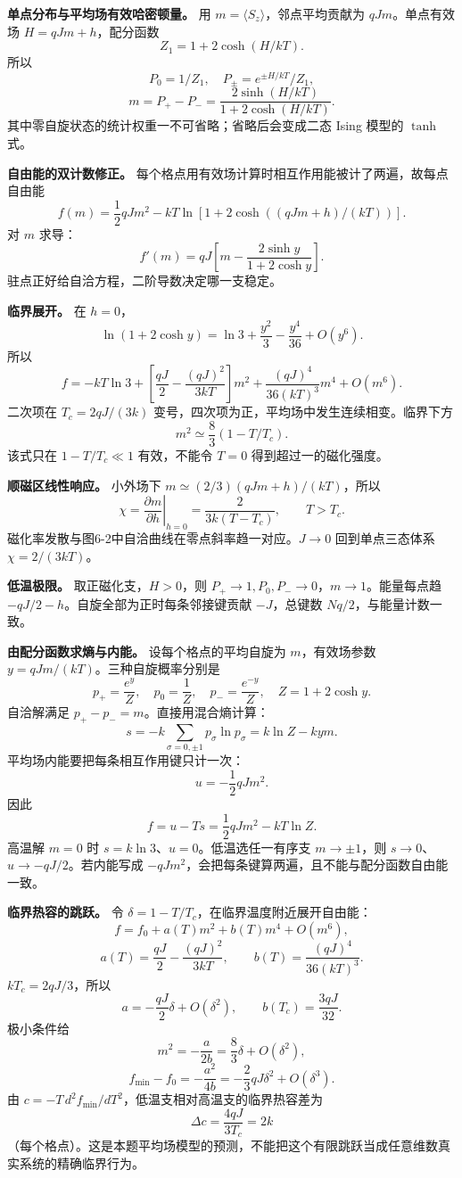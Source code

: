 \documentclass[12pt,a4paper,UTF8]{ctexart}
\begin{document}
\textbf{单点分布与平均场有效哈密顿量。} 用
\(m=\langle S_z\rangle\)，邻点平均贡献为 \(qJm\)。单点有效场
\(H=qJm+h\)，配分函数 \[
Z_1=1+2\cosh(H/kT).
\] 所以 \[
P_0=1/Z_1,\quad P_\pm=e^{\pm H/kT}/Z_1,
\] \[
m=P_+-P_-=\frac{2\sinh(H/kT)}{1+2\cosh(H/kT)}.
\] 其中零自旋状态的统计权重一不可省略；省略后会变成二态 Ising 模型的
\(\tanh\) 式。

\textbf{自由能的双计数修正。}
每个格点用有效场计算时相互作用能被计了两遍，故每点自由能 \[
f(m)=\frac12qJm^2-kT\ln[1+2\cosh((qJm+h)/(kT))].
\] 对 \(m\) 求导： \[
f'(m)=qJ\left[m-\frac{2\sinh y}{1+2\cosh y}\right].
\] 驻点正好给自洽方程，二阶导数决定哪一支稳定。

\textbf{临界展开。} 在 \(h=0\)， \[
\ln(1+2\cosh y)=\ln3+\frac{y^2}3-\frac{y^4}{36}+O(y^6).
\] 所以 \[
f=-kT\ln3+
\left[\frac{qJ}2-\frac{(qJ)^2}{3kT}\right]m^2
+\frac{(qJ)^4}{36(kT)^3}m^4+O(m^6).
\] 二次项在 \(T_c=2qJ/(3k)\)
变号，四次项为正，平均场中发生连续相变。临界下方 \[
\boxed{m^2\simeq\frac83(1-T/T_c)}.
\] 该式只在 \(1-T/T_c\ll1\) 有效，不能令 \(T=0\) 得到超过一的磁化强度。

\textbf{顺磁区线性响应。} 小外场下 \(m\simeq(2/3)(qJm+h)/(kT)\)，所以 \[
\boxed{\chi=\left.\frac{\partial m}{\partial h}\right|_{h=0}
=\frac{2}{3k(T-T_c)}},\qquad T>T_c.
\] 磁化率发散与图6-2中自洽曲线在零点斜率趋一对应。\(J\to0\)
回到单点三态体系 \(\chi=2/(3kT)\)。

\textbf{低温极限。} 取正磁化支，\(H>0\)，则
\(P_+\to1,P_0,P_-\to0\)，\(m\to1\)。能量每点趋
\(-qJ/2-h\)。自旋全部为正时每条邻接键贡献 \(-J\)，总键数
\(Nq/2\)，与能量计数一致。

\textbf{由配分函数求熵与内能。} 设每个格点的平均自旋为 \(m\)，有效场参数
\(y=qJm/(kT)\)。三种自旋概率分别是 \[
p_+=\frac{e^y}{Z},\quad p_0=\frac1Z,\quad
p_-=\frac{e^{-y}}Z,\quad Z=1+2\cosh y.
\] 自洽解满足 \(p_+-p_-=m\)。直接用混合熵计算： \[
s=-k\sum_{\sigma=0,\pm1}p_\sigma\ln p_\sigma
=k\ln Z-kym.
\] 平均场内能要把每条相互作用键只计一次： \[
u=-\frac12qJm^2.
\] 因此 \[
f=u-Ts=\frac12qJm^2-kT\ln Z.
\] 高温解 \(m=0\) 时 \(s=k\ln3\)、\(u=0\)。低温选任一有序支
\(m\to\pm1\)，则 \(s\to0\)、\(u\to-qJ/2\)。若内能写成
\(-qJm^2\)，会把每条键算两遍，且不能与配分函数自由能一致。

\textbf{临界热容的跳跃。} 令
\(\delta=1-T/T_c\)，在临界温度附近展开自由能： \[
f=f_0+a(T)m^2+b(T)m^4+O(m^6),
\] \[
a(T)=\frac{qJ}{2}-\frac{(qJ)^2}{3kT},
\qquad b(T)=\frac{(qJ)^4}{36(kT)^3}.
\] \(kT_c=2qJ/3\)，所以 \[
a=-\frac{qJ}{2}\delta+O(\delta^2),
\qquad b(T_c)=\frac{3qJ}{32}.
\] 极小条件给 \[
m^2=-\frac a{2b}=\frac83\delta+O(\delta^2),
\] \[
f_{\min}-f_0=-\frac{a^2}{4b}
=-\frac23qJ\delta^2+O(\delta^3).
\] 由 \(c=-T\,d^2f_{\min}/dT^2\)，低温支相对高温支的临界热容差为 \[
\boxed{\Delta c=\frac{4qJ}{3T_c}=2k}
\]
（每个格点）。这是本题平均场模型的预测，不能把这个有限跳跃当成任意维数真实系统的精确临界行为。
\end{document}
